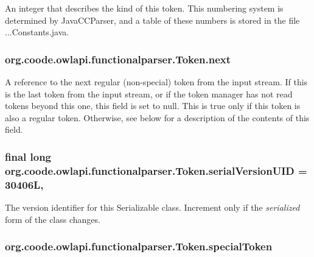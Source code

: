 An integer that describes the kind of this token. This numbering system is determined by Java\-C\-C\-Parser, and a table of these numbers is stored in the file ...Constants.\-java. \hypertarget{classorg_1_1coode_1_1owlapi_1_1functionalparser_1_1_token_a992ace4ef82ad70f1f8665771b39c388}{
\subsubsection[{next}]{ org.\-coode.\-owlapi.\-functionalparser.\-Token.\-next}}\label{classorg_1_1coode_1_1owlapi_1_1functionalparser_1_1_token_a992ace4ef82ad70f1f8665771b39c388}
A reference to the next regular (non-\/special) token from the input stream. If this is the last token from the input stream, or if the token manager has not read tokens beyond this one, this field is set to null. This is true only if this token is also a regular token. Otherwise, see below for a description of the contents of this field. \hypertarget{classorg_1_1coode_1_1owlapi_1_1functionalparser_1_1_token_a2f62c1dd88930bfefe33f2b08c583cce}{
\subsubsection[{serial\-Version\-U\-I\-D}]{\setlength{\rightskip}{0pt plus 5cm}final long org.\-coode.\-owlapi.\-functionalparser.\-Token.\-serial\-Version\-U\-I\-D = 30406\-L\hspace{0.3cm}{\ttfamily [static]}, {\ttfamily [private]}}}\label{classorg_1_1coode_1_1owlapi_1_1functionalparser_1_1_token_a2f62c1dd88930bfefe33f2b08c583cce}
The version identifier for this Serializable class. Increment only if the {\itshape serialized} form of the class changes. \hypertarget{classorg_1_1coode_1_1owlapi_1_1functionalparser_1_1_token_a74f5070694166087d37800fc17455225}{
\subsubsection[{special\-Token}]{ org.\-coode.\-owlapi.\-functionalparser.\-Token.\-special\-Token}}\label{classorg_1_1coode_1_1owlapi_1_1functionalparser_1_1_token_a74f5070694166087d37800fc17455225}
